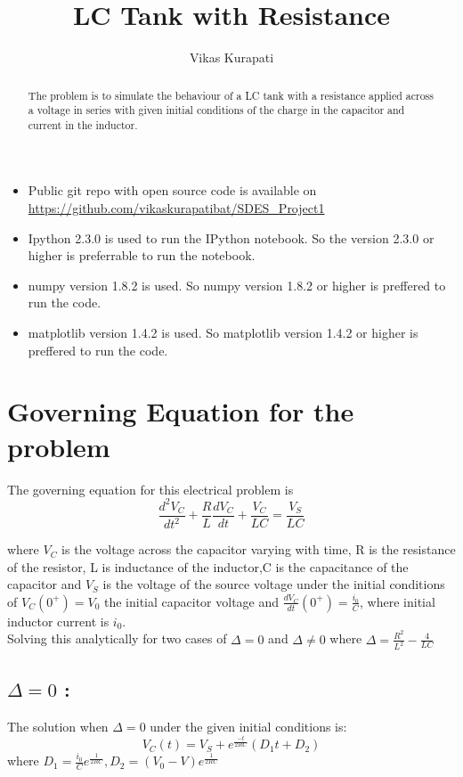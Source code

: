 \documentclass[12pt, a4paper]{report}
\title{\textbf{LC Tank with Resistance}}
\author{Vikas Kurapati}
\affil{Roll No. : 130010058}
\begin{document}
\maketitle
\newpage

\begin{abstract}
 The problem is to simulate the behaviour of a LC tank with a resistance applied across a voltage in series with given initial conditions of the charge in the capacitor and current in the inductor.
\end{abstract}

\begin{itemize}
\item Public git repo with open source code is available on \url{https://github.com/vikaskurapatibat/SDES_Project1}
\item Ipython 2.3.0 is used to run the IPython notebook. So the version 2.3.0 or higher is preferrable to run the notebook.
\item numpy version 1.8.2 is used. So numpy version 1.8.2 or higher is preffered to run the code.
\item matplotlib version 1.4.2 is used. So matplotlib version 1.4.2 or higher is preffered to run the code. 
\end{itemize}

\section*{Governing Equation for the problem}
The governing equation for this electrical problem is 
\begin{equation}
 \frac{d^2V_C}{dt^2} + \frac{R}{L}\frac{dV_C}{dt} + \frac{V_C}{LC} = \frac{V_S}{LC}
\end{equation}

where $V_C$ is the voltage across the capacitor varying with time, R is the resistance of the resistor, L is inductance of the inductor,C is the capacitance of the capacitor and $V_S$ is the voltage of the source voltage under the initial conditions of $V_C(0^+) = V_0$ the initial capacitor voltage and $\frac{dV_C}{dt}(0^+) = \frac{i_0}{C}$, where initial inductor current is $i_0$. \\

Solving this analytically for two cases of $\Delta = 0$ and $\Delta \ne 0$ where $\Delta = \frac{R^2}{L^2} - \frac{4}{LC}$ \\
\subsection*{$\Delta = 0$ :}
The solution when $\Delta = 0$ under the given initial conditions is:
\begin{equation}
 V_C(t) = V_S + e^\frac{-t}{2RC}(D_1t + D_2)
\end{equation}
where $D_1 = \frac{i_0}{C}e^\frac{1}{2RC} , D_2 = (V_0 - V)e^\frac{1}{2RC}$
\end{document}
